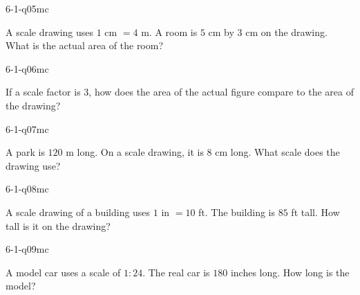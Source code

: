 \begin{practiceQuestion}{6-1-q05}{mc}
\begin{questionText}
A scale drawing uses $1$ cm $= 4$ m. A room is $5$ cm by $3$ cm on the drawing. What is the actual area of the room?
\end{questionText}
\end{practiceQuestion}

\begin{practiceQuestion}{6-1-q06}{mc}
\begin{questionText}
If a scale factor is $3$, how does the area of the actual figure compare to the area of the drawing?
\end{questionText}
\end{practiceQuestion}

\begin{practiceQuestion}{6-1-q07}{mc}
\begin{questionText}
A park is $120$ m long. On a scale drawing, it is $8$ cm long. What scale does the drawing use?
\end{questionText}
\end{practiceQuestion}

\begin{practiceQuestion}{6-1-q08}{mc}
\begin{questionText}
A scale drawing of a building uses $1$ in $= 10$ ft. The building is $85$ ft tall. How tall is it on the drawing?
\end{questionText}
\end{practiceQuestion}

\begin{practiceQuestion}{6-1-q09}{mc}
\begin{questionText}
A model car uses a scale of $1:24$. The real car is $180$ inches long. How long is the model?
\end{questionText}
\end{practiceQuestion}

